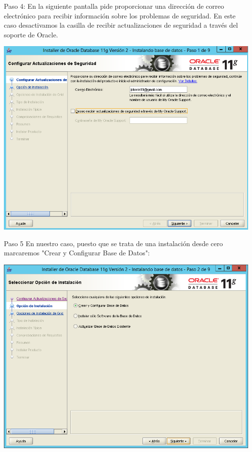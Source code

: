 \documentclass[a4paper,openright,12pt]{book}
\begin{document}
Paso 4: En la siguiente pantalla pide proporcionar una dirección de correo electrónico para recibir información sobre los problemas de seguridad.  En este caso desactivamos la casilla de recibir actualizaciones de seguridad a través del soporte de Oracle.  
\begin{center}
\includegraphics[width=15cm]{./windows server/6.png}
\end{center}
Paso 5 En nuestro caso, puesto que se trata de una instalación desde cero marcaremos "Crear y Configurar Base de Datos":
\begin{center}
\includegraphics[width=15cm]{./windows server/7.png}
\end{center}
\end{document}
